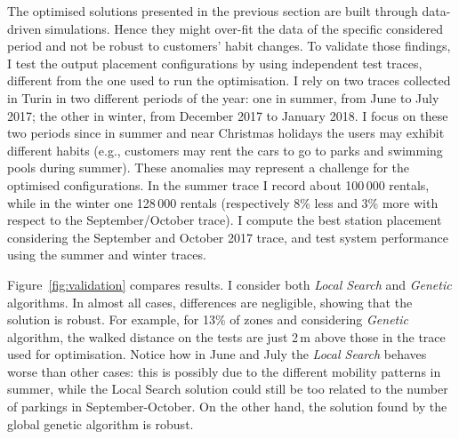 The optimised solutions presented in the previous section are built through data-driven simulations. Hence they might over-fit the data of the specific considered period and not be robust to customers' habit changes. To validate those findings, I test the output placement configurations by using independent test traces, different from the one used to run the optimisation. 
I rely on two traces collected in Turin in two different periods of the year: one in summer, from June to July 2017; the other in winter, from December 2017 to January 2018. I focus on these two periods since in summer and near Christmas holidays the users may exhibit different habits (e.g., customers may rent the cars to go to parks and swimming pools during summer). These anomalies may represent a challenge for the optimised configurations.
In the summer trace I record about  100\,000 rentals, while in the winter one 128\,000 rentals (respectively 8\% less and 3\% more with respect to the September/October trace). I compute the best station placement considering the September and October 2017 trace, and test system performance using the summer and winter traces.  

Figure~\ref{fig:validation} compares results. I consider both \textit{Local Search} and \textit{Genetic} algorithms.
In almost all cases, differences are negligible, showing that the solution is robust. For example, for 13\% of zones and considering \textit{Genetic} algorithm, the walked distance on the tests are just 2\,m above those in the trace used for optimisation. Notice how in June and July the \textit{Local Search} behaves worse than other cases: this is possibly due to the different mobility patterns in summer, while the Local Search solution could still be too related to the number of parkings in September-October. On the other hand, the solution found by the global genetic algorithm is robust.
